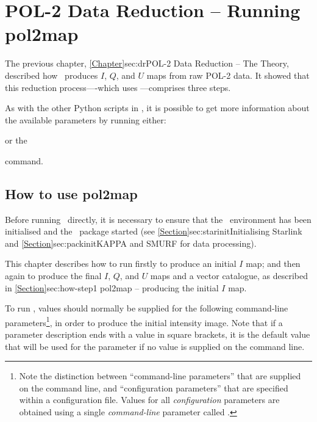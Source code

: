 \chapter{POL-2 Data Reduction -- Running
  pol2map}
\label{sec:rundr}

The previous chapter, \cref{Chapter}{sec:dr}{POL-2 Data Reduction --
  The Theory}, described how \poltwomap\ produces $I$, $Q$, and $U$ maps from raw
POL-2 data.  It showed that this reduction process----which uses
---comprises three steps.

As with the other Python scripts in \SMURF, it is possible to get more
information about the available parameters by running either:
\begin{terminalv}
\end{terminalv}
or the
\begin{terminalv}
\end{terminalv}
command.

\section{How to use pol2map}

Before running \poltwomap\ directly, it is necessary to ensure that
the \starlink\ environment has been initialised and the \smurf\
package started (see \cref{Section}{sec:starinit}{Initialising
  Starlink} and \cref{Section}{sec:packinit}{KAPPA and SMURF for data
  processing}).

This chapter describes how to run  firstly to produce an
initial $I$ map; and then again to produce the final $I$, $Q$, and $U$ maps
and a vector catalogue, as described in \cref{Section}{sec:how-step1}{
pol2map -- producing the initial $I$ map}.

To run , values should normally be supplied for the following
command-line parameters\footnote{Note the distinction between
  ``command-line parameters'' that are supplied on the
   command line, and ``configuration parameters'' that
  are specified within a configuration file. Values for all
  \emph{configuration} parameters are obtained using a single
  \emph{command-line} parameter called .}, in order to
  produce the initial intensity image. Note that if a parameter description ends
  with a value in square brackets, it is the default value that will be used for
  the parameter if no value is supplied on the command line.

